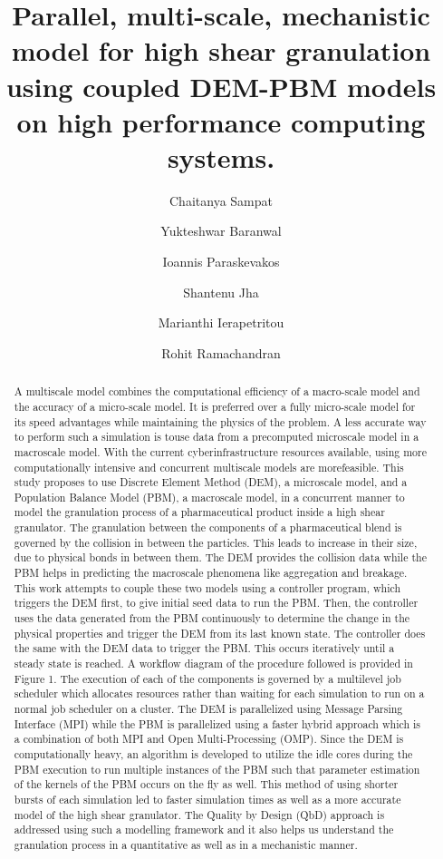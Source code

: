 \documentclass[fleqn,twoside,10pt]{article}
\title{Parallel, multi-scale, mechanistic model for high shear granulation using
coupled DEM-PBM models on high performance computing systems.}
\author[a]{Chaitanya Sampat}
\author[a]{Yukteshwar Baranwal}
\author[b]{Ioannis Paraskevakos}
\author[b]{Shantenu Jha}
\author[a]{Marianthi Ierapetritou}
\author[a,*]{Rohit Ramachandran}
\affil[a]{Department of Chemical and Biochemical Engineering, Rutgers University, Piscataway, NJ-08901, USA}
\affil[b]{Electric and Computer Engineering, Rutgers University, Piscataway, NJ-08901, USA}
\begin{document}
\maketitle             %
\thispagestyle{empty}  %


\begin{abstract}
A multiscale model combines the computational efficiency of a macro-scale model and the
accuracy of a micro-scale model. It is preferred over a fully micro-scale model for its speed advantages while maintaining the physics 
of the problem. A less accurate way to perform such a simulation is touse data from a precomputed microscale model in a macroscale 
model. With the current cyberinfrastructure resources available, using more computationally intensive and concurrent multiscale models 
are morefeasible. This study proposes to use Discrete Element Method (DEM), a microscale model, and a Population Balance Model (PBM), 
a macroscale model, in a concurrent manner to model the granulation process of a pharmaceutical product inside a high shear 
granulator. The granulation between the components of a pharmaceutical blend is governed by the collision in between the particles. 
This leads to increase in their size, due to physical bonds in between them. The DEM provides the collision data while the PBM helps 
in predicting the macroscale phenomena like aggregation and breakage. This work attempts to couple these two models using a controller 
program, which triggers the DEM first, to give initial seed data to run the PBM. Then, the controller uses the data generated from the 
PBM continuously to determine the change in the physical properties and trigger the DEM from its last known state. The controller does 
the same with the DEM data to trigger the PBM. This occurs iteratively until a steady state is reached. A workflow diagram of the 
procedure followed is provided in Figure 1. The execution of each of the components is governed by a multilevel job scheduler which 
allocates resources rather than waiting for each simulation to run on a
normal job scheduler on a cluster. The DEM is parallelized using Message Parsing Interface (MPI) while the PBM is parallelized using a 
faster hybrid approach which is a combination of both MPI and Open Multi-Processing (OMP). Since the DEM is computationally heavy, an 
algorithm is developed to utilize the idle cores during the PBM execution to run multiple instances of the PBM such that parameter 
estimation of the kernels of the PBM occurs on the fly as well. This method of using shorter bursts of each simulation led to faster 
simulation times as well as a more accurate model of the high shear granulator. The Quality by Design (QbD) approach is addressed 
using such a modelling framework and it also helps us understand the
granulation process in a quantitative as well as in a mechanistic manner.
\end{abstract}
\end{document}
